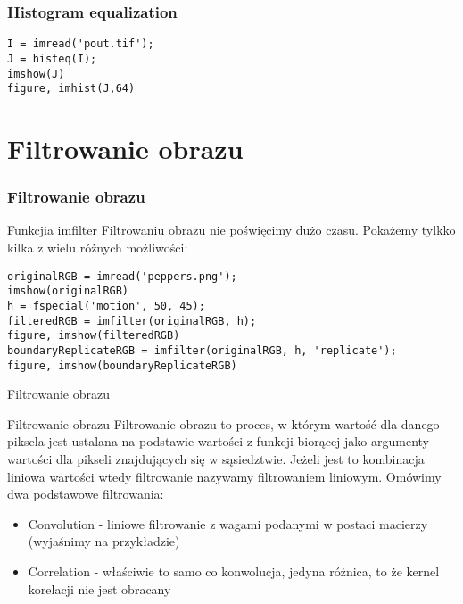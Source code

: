 \documentclass{beamer}
\begin{document}
\begin{frame}[fragile]
\frametitle{Histogram equalization}
\begin{example}
\begin{lstlisting}
I = imread('pout.tif');
J = histeq(I);
imshow(J)
figure, imhist(J,64)
\end{lstlisting}
\end{example}
\end{frame}

\section{Filtrowanie obrazu}

\begin{frame}[fragile]
\frametitle{Filtrowanie obrazu}
\begin{block}{Funkcjia imfilter}
Filtrowaniu obrazu nie poświęcimy dużo czasu. Pokażemy tylkko kilka z wielu różnych możliwości:
\end{block}

\begin{example}
\begin{lstlisting}
originalRGB = imread('peppers.png');
imshow(originalRGB)
h = fspecial('motion', 50, 45);
filteredRGB = imfilter(originalRGB, h);
figure, imshow(filteredRGB)
boundaryReplicateRGB = imfilter(originalRGB, h, 'replicate');
figure, imshow(boundaryReplicateRGB)
\end{lstlisting}
\end{example}

\end{frame}

\begin{frame}{Filtrowanie obrazu}
\begin{block}{Filtrowanie obrazu}
Filtrowanie obrazu to proces, w którym wartość dla danego piksela jest ustalana na podstawie wartości z funkcji biorącej jako argumenty wartości dla pikseli znajdujących się w sąsiedztwie. Jeżeli jest to kombinacja liniowa wartości wtedy filtrowanie nazywamy filtrowaniem liniowym.
Omówimy dwa podstawowe filtrowania:
\end{block}

\begin{itemize}
	\item Convolution - liniowe filtrowanie z wagami podanymi w postaci macierzy (wyjaśnimy na przykładzie)
	\item Correlation - właściwie to samo co konwolucja, jedyna różnica, to że kernel korelacji nie jest obracany
\end{itemize}

\end{frame}
\end{document}
